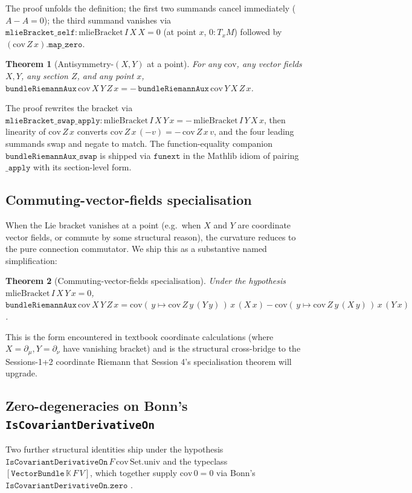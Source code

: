 \documentclass[twocolumn]{revtex4-2}
\newtheorem{theorem}{Theorem}
\begin{document}
The proof unfolds the definition; the first two summands cancel
immediately ($A - A = 0$); the third summand vanishes via
$\mathtt{mlieBracket\_self} : \mathrm{mlieBracket}\,I\,X\,X = 0$
(at point $x$, $0 : T_xM$) followed by
$(\mathrm{cov}\,Z\,x).\mathtt{map\_zero}$.

\begin{theorem}[Antisymmetry-$(X, Y)$ at a point]\label{thm:bundleRiem-swap}
For any $\mathrm{cov}$, any vector fields $X, Y$, any section $Z$,
and any point $x$,
$\mathtt{bundleRiemannAux}\,\mathrm{cov}\,X\,Y\,Z\,x
  = -\,\mathtt{bundleRiemannAux}\,\mathrm{cov}\,Y\,X\,Z\,x$.
\end{theorem}

The proof rewrites the bracket via
$\mathtt{mlieBracket\_swap\_apply} : \mathrm{mlieBracket}\,I\,X\,Y\,x
  = -\,\mathrm{mlieBracket}\,I\,Y\,X\,x$, then linearity of
$\mathrm{cov}\,Z\,x$ converts $\mathrm{cov}\,Z\,x\,(-v) =
-\,\mathrm{cov}\,Z\,x\,v$, and the four leading summands swap and
negate to match. The function-equality companion
$\texttt{bundleRiemannAux\_swap}$ is shipped via $\mathtt{funext}$ in
the Mathlib idiom of pairing $\texttt{\_apply}$ with its section-level
form.

\subsection{Commuting-vector-fields specialisation}
When the Lie bracket vanishes at a point (e.g.\ when $X$ and $Y$ are
coordinate vector fields, or commute by some structural reason), the
curvature reduces to the pure connection commutator. We ship this as
a substantive named simplification:

\begin{theorem}[Commuting-vector-fields specialisation]\label{thm:bundleRiem-commute}
Under the hypothesis $\mathrm{mlieBracket}\,I\,X\,Y\,x = 0$,
$\mathtt{bundleRiemannAux}\,\mathrm{cov}\,X\,Y\,Z\,x =
\mathrm{cov}(\,y \mapsto \mathrm{cov}\,Z\,y\,(Y\,y)\,)\,x\,(X\,x) -
\mathrm{cov}(\,y \mapsto \mathrm{cov}\,Z\,y\,(X\,y)\,)\,x\,(Y\,x)$.
\end{theorem}

This is the form encountered in textbook coordinate calculations
(where $X = \partial_{\mu}, Y = \partial_{\nu}$ have vanishing
bracket) and is the structural cross-bridge to the Sessions-1+2
coordinate Riemann that Session 4's specialisation theorem will
upgrade.

\subsection{Zero-degeneracies on Bonn's
\texttt{IsCovariantDerivativeOn}}
\label{sec:bundle-aux-zero}
Two further structural identities ship under the hypothesis
$\mathtt{IsCovariantDerivativeOn}\,F\,\mathrm{cov}\,\mathrm{Set.univ}$
and the typeclass $[\mathtt{VectorBundle}\,\mathbb{K}\,F\,V]$, which
together supply $\mathrm{cov}\,0 = 0$ via Bonn's
$\texttt{IsCovariantDerivativeOn.zero}$ \cite{MassotRothgangMacbeth2025}.
\end{document}
